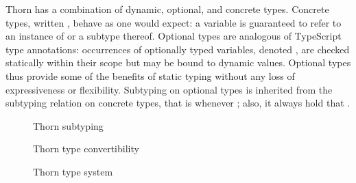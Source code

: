 \documentclass[acmsmall, anonymous, authordraft, review]{acmart} %
\begin{document}
Thorn has a combination of dynamic, optional, and concrete types.  Concrete
types, written \C, behave as one would expect: a variable \HT\x\C is
guaranteed to refer to an instance of \C or a subtype thereof.  Optional
types are analogous of TypeScript type annotations: occurrences of
optionally typed variables, denoted \HT\x{\dt\C}, are checked statically
within their scope but may be bound to dynamic values.  Optional types thus
provide some of the benefits of static typing without any loss of
expressiveness or flexibility.  Subtyping on optional types is inherited
from the subtyping relation on concrete types, that is {\dt\C} \Sub {\dt\D}
whenever \C \Sub \D; also, it always hold that \C \Sub \dt\C.

\begin{figure}[!t]

\hrulefill  \small
\vspace{-3mm}
  
\begin{mathpar}

\end{mathpar}

\hrulefill
\caption{Thorn subtyping}\label{subth}

\hrulefill  \small
\vspace{-3mm}
  
\begin{mathpar}
\end{mathpar}

\hrulefill
\caption{Thorn type convertibility}\label{convth}


\hrulefill  
\vspace{0.5mm}

\begin{mathpar}  
\end{mathpar}

\hrulefill
\caption{Thorn type system}\label{thts}
 

\hrulefill


\end{figure}
\end{document}
